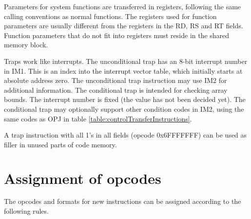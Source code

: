 \documentclass[forwardcom.tex]{subfiles}
\begin{document}
Parameters for system functions are transferred in registers, following the same calling conventions as normal functions. The registers used for function parameters are usually different from the registers in the RD, RS and RT fields. Function parameters that do not fit into registers must reside in the shared memory block.
\vspace{2mm}

Traps work like interrupts. The unconditional trap has an 8-bit interrupt number in IM1. This is an index into the interrupt vector table, which initially starts at absolute address zero. The unconditional trap instruction may use IM2 for additional information. The conditional trap is intended for checking array bounds. The interrupt number is fixed (the value has not been decided yet). The conditional trap may optionally support other condition codes in IM2, using the same codes as OPJ in table \ref{table:controlTransferInstructions}.
\vspace{2mm}

A trap instruction with all 1's in all fields (opcode 0x6FFFFFFF) can be used as filler in unused parts of code memory.

\section{Assignment of opcodes}
The opcodes and formats for new instructions can be assigned according to the following rules.
\end{document}
